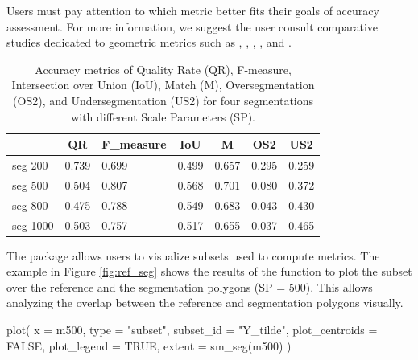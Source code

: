 Users must pay attention to which metric better fits their goals of accuracy assessment. For more information, we suggest the user consult comparative studies dedicated to geometric metrics such as \citet{Clinton2010}, \citet{Rasanen2013}, \citet{Yang2015}, \citet{Costa2018}, and \citet{Jozdani2020}.


\begin{table}[htbp]
\caption{Accuracy metrics of Quality Rate (QR), F-measure, Intersection over Union (IoU), Match (M), Oversegmentation (OS2), and Undersegmentation (US2) for four segmentations with different Scale Parameters (SP).}
\centering
\small
\begin{tabular}{lllllll}
\toprule
 & \multicolumn{1}{c}{\textbf{QR}} & \multicolumn{1}{c}{\textbf{F\_measure}} & \multicolumn{1}{c}{\textbf{IoU}} & \multicolumn{1}{c}{\textbf{M}} & \multicolumn{1}{c}{\textbf{OS2}} & \multicolumn{1}{c}{\textbf{US2}} \\ \midrule
seg 200 & 0.739 & 0.699 & 0.499 & 0.657 & 0.295 & 0.259 \\
seg 500 & 0.504 & 0.807 & 0.568 & 0.701 & 0.080 & 0.372 \\
seg 800 & 0.475 & 0.788 & 0.549 & 0.683 & 0.043 & 0.430 \\
seg 1000 & 0.503 & 0.757 & 0.517 & 0.655 & 0.037 & 0.465 \\
\bottomrule
\end{tabular}
\label{tab:result}
\end{table}

The  package allows users to visualize subsets used to compute metrics. The example in Figure \ref{fig:ref_seg} shows the results of the function to plot the subset  over the reference and the segmentation polygons (SP = 500). This allows analyzing the overlap between the reference and segmentation polygons visually.

\begin{example}


plot(
    x = m500, 
    type = "subset", 
    subset_id = "Y_tilde", 
    plot_centroids = FALSE, 
    plot_legend = TRUE, 
    extent = sm_seg(m500) 
)
\end{example}

